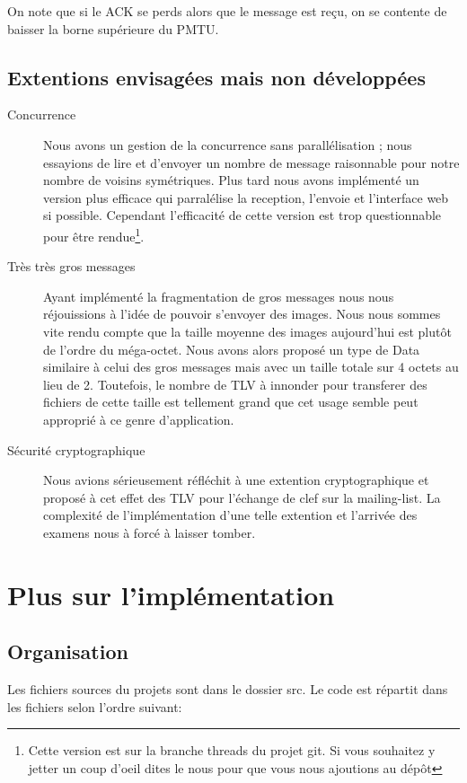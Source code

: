 \documentclass[a4paper,10pt]{article} %
\begin{document}
On note que si le ACK se perds alors que le message est reçu, on se contente de baisser la borne supérieure du PMTU.


\subsection{Extentions envisagées mais non développées}

\begin{description}
\item[Concurrence] Nous avons un gestion de la concurrence sans parallélisation ; nous essayions de lire et d'envoyer un nombre de message raisonnable pour notre nombre de voisins symétriques. Plus tard nous avons implémenté un version plus efficace qui parralélise la reception, l'envoie et l'interface web si possible. Cependant l'efficacité de cette version est trop questionnable pour être rendue\footnote{Cette version est sur la branche \textrm{threads} du projet git. Si vous souhaitez y jetter un coup d'oeil dites le nous pour que vous nous ajoutions au dépôt}.
\item[Très très gros messages] Ayant implémenté la fragmentation de gros messages nous nous réjouissions à l'idée de pouvoir s'envoyer des images. Nous nous sommes vite rendu compte que la taille moyenne des images aujourd'hui est plutôt de l'ordre du méga-octet. Nous avons alors proposé un type de Data similaire à celui des gros messages mais avec un taille totale sur 4 octets au lieu de 2. Toutefois, le nombre de TLV à innonder pour transferer des fichiers de cette taille est tellement grand que cet usage semble peut approprié à ce genre d'application.
\item[Sécurité cryptographique] Nous avions sérieusement réfléchit à une extention cryptographique et proposé à cet effet des TLV pour l'échange de clef sur la mailing-list. La complexité de l'implémentation d'une telle extention et l'arrivée des examens nous à forcé à laisser tomber.
\end{description}

\section{Plus sur l'implémentation\label{sec:implem}}
\subsection{Organisation}

Les fichiers sources du projets sont dans le dossier \textrm{src}. Le code est répartit dans les fichiers selon l'ordre suivant:
\end{document}

